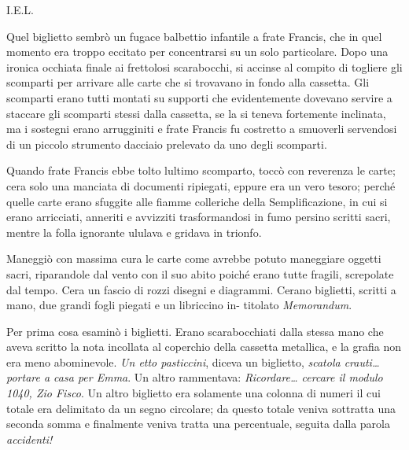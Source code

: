 \begin{center}
	I.E.L.
\end{center}

\begin{center}
\end{center}

Quel biglietto sembrò un fugace balbettio infantile a frate Francis, che
in quel momento era troppo eccitato per concentrarsi su un solo
particolare. Dopo una ironica occhiata finale ai frettolosi scarabocchi,
si accinse al compito di togliere gli scomparti per arrivare alle carte
che si trovavano in fondo alla cassetta. Gli scomparti erano tutti
montati su supporti che evidentemente dovevano servire a staccare gli
scomparti stessi dalla cassetta, se la si teneva fortemente inclinata,
ma i sostegni erano arrugginiti e frate Francis fu costretto a smuoverli
servendosi di un piccolo strumento d\textquotesingle acciaio prelevato
da uno degli scomparti.

Quando frate Francis ebbe tolto l\textquotesingle ultimo scomparto,
toccò con reverenza le carte; c\textquotesingle era solo una manciata di
documenti ripiegati, eppure era un vero tesoro; perché quelle carte
erano sfuggite alle fiamme colleriche della Semplificazione, in cui si
erano arricciati, anneriti e avvizziti trasformandosi in fumo persino
scritti sacri, mentre la folla ignorante ululava e gridava in trionfo.

Maneggiò con massima cura le carte come avrebbe potuto maneggiare
oggetti sacri, riparandole dal vento con il suo abito poiché erano tutte
fragili, screpolate dal tempo. C\textquotesingle era un fascio di rozzi
disegni e diagrammi. C\textquotesingle erano biglietti, scritti a mano,
due grandi fogli piegati e un libriccino in- titolato \emph{Memorandum}.

Per prima cosa esaminò i biglietti. Erano scarabocchiati dalla stessa
mano che aveva scritto la nota incollata al coperchio della cassetta
metallica, e la grafia non era meno abominevole. \emph{Un etto
	pasticcini}, diceva un biglietto, \emph{scatola crauti\ldots{} portare a
	casa per Emma}. Un altro rammentava: \emph{Ricordare\ldots{} cercare il
	modulo 1040, Zio Fisco}. Un altro biglietto era solamente una colonna di
numeri il cui totale era delimitato da un segno circolare; da questo
totale veniva sottratta una seconda somma e finalmente veniva tratta una
percentuale, seguita dalla parola \emph{accidenti!}

